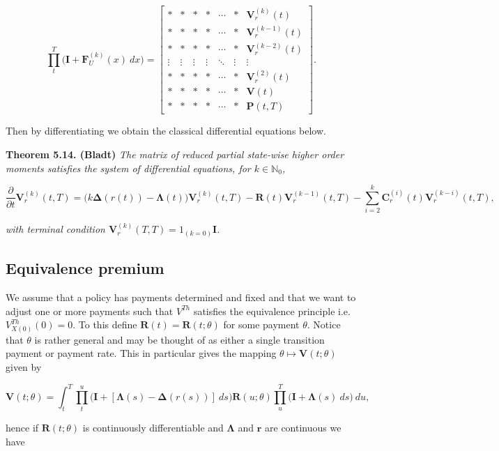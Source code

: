 \documentclass[a4paper,10pt,openany]{book}
\begin{document}
\[
\prod_t^T\Big(\mathbf I + \mathbf F_U^{(k)}(x)\ dx\Big)=
\begin{bmatrix}
* & * & * & * & \cdots &* & \mathbf V_r^{(k)}(t)\\
* & * & * & * & \cdots &* & \mathbf V_r^{(k-1)}(t)\\
* & * & * & * & \cdots &* & \mathbf V_r^{(k-2)}(t)\\
\vdots & \vdots & \vdots & \vdots & \ddots &\vdots & \vdots\\
* & * & * & * & \cdots &* & \mathbf V_r^{(2)}(t)\\
* & * & * & * & \cdots &* & \mathbf V(t)\\
* & * & * & * & \cdots &* & \mathbf P(t,T)
\end{bmatrix}.
\]

Then by differentiating we obtain the classical differential equations below.

\textbf{Theorem 5.14. (Bladt)} \emph{The matrix of reduced partial state-wise higher order moments satisfies the system of differential equations, for \(k\in \mathbb N_0\),}

\[
\frac{\partial}{\partial t}\mathbf V_r^{(k)}(t,T)=\Big(k\mathbf\Delta(r(t)) - \mathbf \Lambda(t)\Big)\mathbf V_r^{(k)}(t,T)-\mathbf R(t)\mathbf V_r^{(k-1)}(t,T)-\sum_{i=2}^k\mathbf C_r^{(i)}(t)\mathbf V_r^{(k-i)}(t,T),
\]

\emph{with terminal condition \(\mathbf V_r^{(k)}(T,T)=1_{(k=0)}\mathbf I\).}

\hypertarget{equivalence-premium}{%
\subsection{Equivalence premium}\label{equivalence-premium}}

We assume that a policy has payments determined and fixed and that we want to adjust one or more payments such that \(V^{Th}\) satisfies the equivalence principle i.e.~\(V_{X(0)}^{Th}(0)=0\). To this define \(\mathbf R(t)=\mathbf R(t;\theta)\) for some payment \(\theta\). Notice that \(\theta\) is rather general and may be thought of as either a single transition payment or payment rate. This in particular gives the mapping \(\theta \mapsto \mathbf V(t;\theta)\) given by

\[
\mathbf V(t;\theta) = \int_t^T\prod_t^u\Big(\mathbf I +[\mathbf\Lambda(s)-\mathbf\Delta(r(s))]\ ds\Big)\mathbf R(u;\theta)\prod_u^T\Big(\mathbf I +\mathbf \Lambda(s)\ ds\Big)\ du,
\]

hence if \(\mathbf R(t;\theta)\) is continuously differentiable and \(\mathbf \Lambda\) and \(\mathbf r\) are continuous we have
\end{document}
